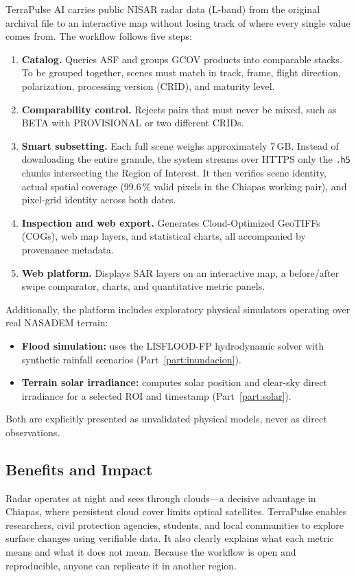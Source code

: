\documentclass[11pt,a4paper]{article}
\begin{document}
TerraPulse AI carries public NISAR radar data (L-band) from the original archival file to an interactive
map without losing track of where every single value comes from. The workflow follows five steps:
\begin{enumerate}
  \item \textbf{Catalog.} Queries ASF and groups GCOV products into comparable stacks. To be grouped together, scenes must match in track, frame, flight direction, polarization, processing version (CRID), and maturity level.
  \item \textbf{Comparability control.} Rejects pairs that must never be mixed, such as BETA with
        PROVISIONAL or two different CRIDs.
  \item \textbf{Smart subsetting.} Each full scene weighs approximately 7\,GB. Instead of downloading the entire granule, the system
        streams over HTTPS only the \texttt{.h5} chunks intersecting the Region of Interest.
        It then verifies scene identity, actual spatial coverage (99.6\,\% valid pixels in the
        Chiapas working pair), and pixel-grid identity across both dates.
  \item \textbf{Inspection and web export.} Generates Cloud-Optimized GeoTIFFs (COGs), web map layers, and statistical charts, all accompanied by provenance metadata.
  \item \textbf{Web platform.} Displays SAR layers on an interactive map, a before/after swipe comparator, charts, and quantitative metric panels.
\end{enumerate}
Additionally, the platform includes exploratory physical simulators operating over real NASADEM terrain:
\begin{itemize}
  \item \textbf{Flood simulation:} uses the LISFLOOD-FP hydrodynamic solver with synthetic rainfall scenarios
        (Part~\ref{part:inundacion}).
  \item \textbf{Terrain solar irradiance:} computes solar position and clear-sky direct irradiance
        for a selected ROI and timestamp (Part~\ref{part:solar}).
\end{itemize}
Both are explicitly presented as unvalidated physical models, never as direct observations.

\subsection{Benefits and Impact}

Radar operates at night and sees through clouds---a decisive advantage in Chiapas, where persistent cloud cover limits optical satellites. TerraPulse enables researchers, civil protection agencies, students, and local communities to explore surface changes using verifiable data. It also clearly explains what each metric means and what it does not mean. Because the workflow is open and reproducible, anyone can replicate it in another region.
\end{document}
